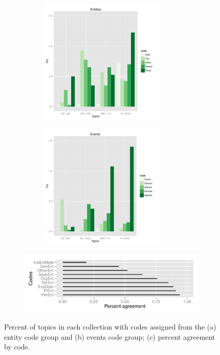\documentclass{sig-alternate}
\begin{document}
\begin{figure}[!ht]
\centering
\begin{subfigure}{.5\textwidth}
  \centering
\includegraphics[width=8cm, height=6cm]{plots/topic-groups-ent.pdf}
\end{subfigure}%
\begin{subfigure}{.5\textwidth}
  \centering
\includegraphics[width=8cm, height=6cm]{plots/topic-groups-evt.pdf}
\end{subfigure}
\begin{subfigure}{\textwidth}
\includegraphics[width=17cm]{plots/coder-agreement.pdf}
\end{subfigure}
\caption{Percent of topics in each collection with codes assigned from the (a) entity code group and (b) events code group; (c) percent agreement by code.}
\label{fig.codedist}
\end{figure}
\end{document}
